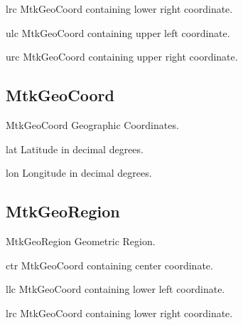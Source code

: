 \documentclass{howto}
\begin{document}
\begin{memberdesc}[MtkGeoCoord]{lrc}
  MtkGeoCoord containing lower right coordinate.
\end{memberdesc}

\begin{memberdesc}[MtkGeoCoord]{ulc}
  MtkGeoCoord containing upper left coordinate.
\end{memberdesc}

\begin{memberdesc}[MtkGeoCoord]{urc}
  MtkGeoCoord containing upper right coordinate.
\end{memberdesc}


\subsection{MtkGeoCoord \label{mtkgeocoord}}

\begin{classdesc*}{MtkGeoCoord}
  Geographic Coordinates.
\end{classdesc*}

\begin{memberdesc}[float]{lat}
  Latitude in decimal degrees.
\end{memberdesc}

\begin{memberdesc}[float]{lon}
  Longitude in decimal degrees.
\end{memberdesc}


\subsection{MtkGeoRegion \label{mtkgeoregion}}

\begin{classdesc*}{MtkGeoRegion}
  Geometric Region.
\end{classdesc*}

\begin{memberdesc}[MtkGeoCoord]{ctr}
  MtkGeoCoord containing center coordinate.
\end{memberdesc}

\begin{memberdesc}[MtkGeoCoord]{llc}
  MtkGeoCoord containing lower left coordinate.
\end{memberdesc}

\begin{memberdesc}[MtkGeoCoord]{lrc}
  MtkGeoCoord containing lower right coordinate.
\end{memberdesc}
\end{document}

